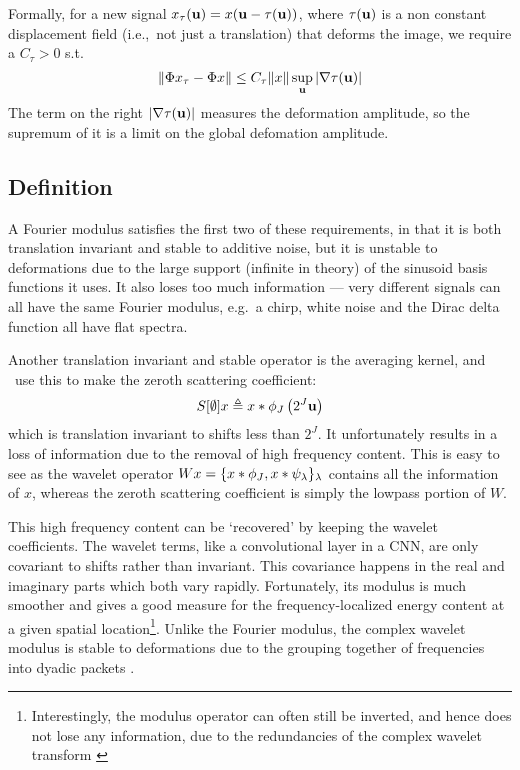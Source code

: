   Formally, for a new signal
  $x_{\tau}(\mathbf{u}) = x(\mathbf{u}-\tau(\mathbf{u}))$, where $\tau(\mathbf{u})$ is a non
  constant displacement field (i.e.,\ not just a translation) that deforms the
  image, we require a $C_\tau>0$ s.t.
  \protect\begin{equation}\label{eq:scat_deformation_stability}
    \|\Phi x_{\tau} - \Phi x \| \leq C_\tau \|x\| \sup_{\mathbf{u}} |\nabla\tau(\mathbf{u})|
  \protect\end{equation}
  The term on the right $|\nabla\tau(\mathbf{u})|$ measures the deformation
  amplitude, so the supremum of it is a limit on the global defomation amplitude.

\subsection{Definition}
  A Fourier modulus satisfies the first two of these requirements, in that it is
  both translation invariant and stable to additive noise, but it is unstable to
  deformations due to the large support (infinite in theory) of the sinusoid basis functions it
  uses. It also loses too much information --- very different signals can all
  have the same Fourier modulus, e.g.\ a chirp, white noise and the Dirac delta
  function all have flat spectra.

  Another translation invariant and stable operator is the averaging kernel, and
  \Mallat\ use this to make the zeroth scattering coefficient:
  \begin{equation}
    S[\emptyset]x \triangleq x \ast \phi_J\left(2^J \mathbf{u}\right)
  \end{equation}
  which is translation invariant to shifts less than $2^J$. It unfortunately
  results in a loss of information due to the removal of high frequency content.
  This is easy to see as the wavelet operator 
  $Wx = \{ x \ast \phi_J, x \ast \psi_\lambda \}_\lambda$
contains all the information of $x$, whereas the zeroth scattering coefficient
is simply the lowpass portion of $W$. 

This high frequency content can be `recovered' by keeping the wavelet
coefficients. The wavelet terms, like a convolutional layer in a CNN, are only
covariant to shifts rather than invariant. This covariance happens in the real 
and imaginary parts which both vary rapidly. Fortunately, its modulus is much
smoother and gives a good measure for the frequency-localized energy content at
a given spatial location\footnote{Interestingly, the modulus operator can often still be
inverted, and hence does not lose any information, due to the redundancies of
the complex wavelet transform \cite{waldspurger_phase_2012}}. Unlike
the Fourier modulus, the complex wavelet modulus is stable to deformations due
to the grouping together of frequencies into dyadic packets
\cite{mallat_group_2012}. 

